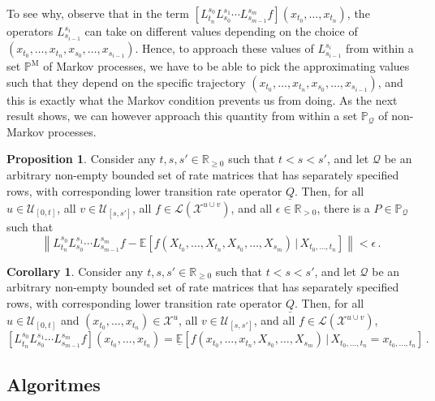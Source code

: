 \documentclass[10pt]{paper}
\theoremstyle{definition}
\newtheorem{proposition}[theorem]{Proposition}
\newtheorem{corollary}[theorem]{Corollary}
\newcommand{\reals}{\mathbb{R}}
\newcommand{\realspos}{\reals_{>0}}
\newcommand{\realsnonneg}{\reals_{\geq 0}}
\newcommand{\states}{\mathcal{X}}
\newcommand{\processes}{\mathbb{P}}
\newcommand{\mprocesses}{\processes^{\mathrm{M}}}
\newcommand{\gambles}{\mathcal{L}}
\newcommand{\rateset}{\mathcal{Q}}
\newcommand{\lrate}{\underline{Q}}
\newcommand{\norm}[1]{\left\lVert #1 \right\rVert}
\begin{document}
To see why, observe that in the term $[L_{t_n}^{s_0}L_{s_0}^{s_1}\cdots L_{s_{m-1}}^{s_m}f](x_{t_0},\ldots,x_{t_n})$, the operators $L_{s_{i-1}}^{s_i}$ can take on different values depending on the choice of $(x_{t_0},\ldots,x_{t_n},x_{s_0},\ldots,x_{s_{i-1}})$. Hence, to approach these values of $L_{s_{i-1}}^{s_i}$ from within a set $\mprocesses$ of Markov processes, we have to be able to pick the approximating values such that they depend on the specific trajectory $(x_{t_0},\ldots,x_{t_n},x_{s_0},\ldots,x_{s_{i-1}})$, and this is exactly what the Markov condition prevents us from doing. As the next result shows, we can however approach this quantity from within a set $\processes_\rateset$ of non-Markov processes.

\begin{proposition}\label{prop:multivar_bound_tight}
Consider any $t,s,s'\in\realsnonneg$ such that $t<s<s'$, and let $\rateset$ be an arbitrary non-empty bounded set of rate matrices that has separately specified rows, with corresponding lower transition rate operator $\lrate$. Then, for all $u\in\mathcal{U}_{[0,t]}$, all $v\in\mathcal{U}_{[s,s']}$, all $f\in\gambles(\states^{u\cup v})$, and all $\epsilon\in\realspos$, there is a $P\in\processes_\rateset$ such that
\begin{equation*}
\norm{L_{t_n}^{s_0}L_{s_0}^{s_1}\cdots L_{s_{m-1}}^{s_m}f - \mathbb{E}[f(X_{t_0},\ldots,X_{t_n},X_{s_0},\ldots,X_{s_m})\,\vert\,X_{t_0,\ldots,t_n}]} < \epsilon\,.
\end{equation*}
\end{proposition}

\begin{corollary}\label{cor:inf_works_for_multivar}
Consider any $t,s,s'\in\realsnonneg$ such that $t<s<s'$, and let $\rateset$ be an arbitrary non-empty bounded set of rate matrices that has separately specified rows, with corresponding lower transition rate operator $\lrate$. Then, for all $u\in\mathcal{U}_{[0,t]}$ and $(x_{t_0},\ldots,x_{t_n})\in\states^u$, all $v\in\mathcal{U}_{[s,s']}$, and all $f\in\gambles(\states^{u\cup v})$,
\begin{equation*}
\left[L_{t_n}^{s_0}L_{s_0}^{s_1}\cdots L_{s_{m-1}}^{s_m}f\right](x_{t_0},\ldots,x_{t_n}) = \underline{\mathbb{E}}[f(x_{t_0},\ldots,x_{t_n},X_{s_0},\ldots,X_{s_m})\,\vert\,X_{t_0,\ldots,t_n}=x_{t_0,\ldots,t_n}]\,.
\end{equation*}
\end{corollary}

\subsection{Algoritmes}\label{sec:tractability}
\end{document}
